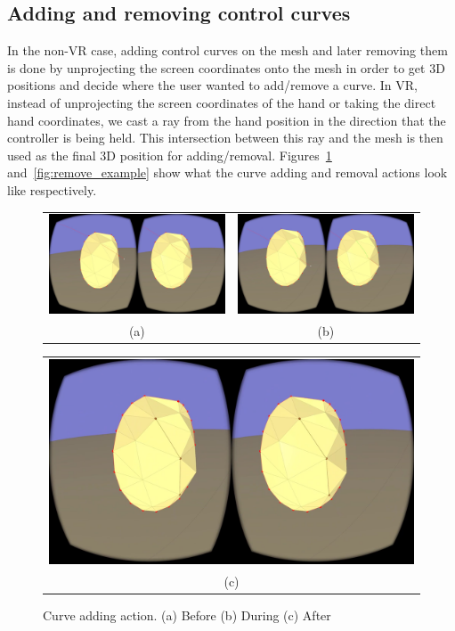 \subsection{Adding and removing control curves}
In the non-VR case, adding control curves on the mesh and later removing them is done by unprojecting the screen coordinates onto the mesh in order to get 3D positions and decide where the user wanted to add/remove a curve. In VR, instead of unprojecting the screen coordinates of the hand or taking the direct hand coordinates, we cast a ray from the hand position in the direction that the controller is being held. This intersection between this ray and the mesh is then used as the final 3D position for adding/removal. Figures~\ref{fig:add_example} and~\ref{fig:remove_example} show what the curve adding and removal actions look like respectively.

\begin{figure}[!h]
    \centering
    \setlength{\tabcolsep}{0.0130\linewidth}
    \begin{tabular}{@{}cc@{}}
    \includegraphics[width=0.45\linewidth]{figures/pre_add} &
       	\includegraphics[width=0.45\linewidth]{figures/during_add} \\
       	(a)&(b)\\
       	\end{tabular}
       	
       	  \centering
    \setlength{\tabcolsep}{0.0130\linewidth}
    \begin{tabular}{@{}c@{}}
    \includegraphics[width=0.926\linewidth]{figures/post_add}\\
    (c)
    \end{tabular}
    \caption[Curve adding action]{Curve adding action.
    	  \textup{(a)} Before \textup{(b)} During \textup{(c)} After
      \label{fig:add_example}}
\end{figure}


